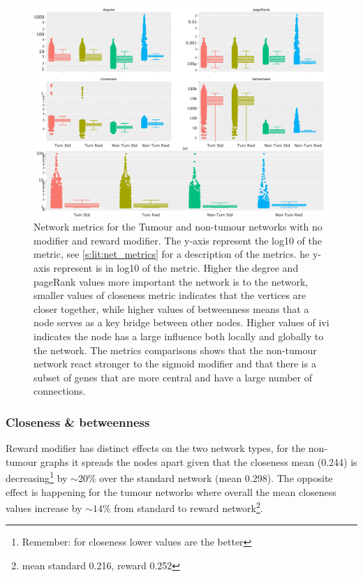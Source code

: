 \begin{figure}[!htb]    
    \centering
    \includegraphics[width=1.0\textwidth,keepaspectratio]{Sections/Network_II/validation/network_comparison.png}
    \caption{Network metrics for the Tumour and non-tumour networks with no modifier and reward modifier. The y-axis represent the log10 of the metric, see \cref{s:lit:net_metrics} for a description of the metrics. he y-axis represent is in log10 of the metric. Higher the degree and pageRank values more important the network is to the network, smaller values of closeness metric indicates that the vertices are closer together, while higher values of betweenness means that a node serves as a key bridge between other nodes. Higher values of \acrlong{ivi} indicates the node has a large influence both locally and globally to the network. The metrics comparisons shows that the non-tumour network react stronger to the sigmoid modifier and that there is a subset of genes that are more central and have a large number of connections.}
    \label{fig:N_II:net_metrics_comp}
\end{figure}


\subsubsection*{Closeness \& betweenness}

Reward modifier has distinct effects on the two network types, for the non-tumour graphs it spreads the nodes apart given that the closeness mean (0.244) is decreasing\footnote{Remember: for closeness lower values are the better} by $\sim20\%$ over the standard network (mean 0.298). The opposite effect is happening for the tumour networks where overall the mean closeness values increase by $\sim14\%$ from standard to reward network\footnote{mean standard 0.216, reward 0.252}.

